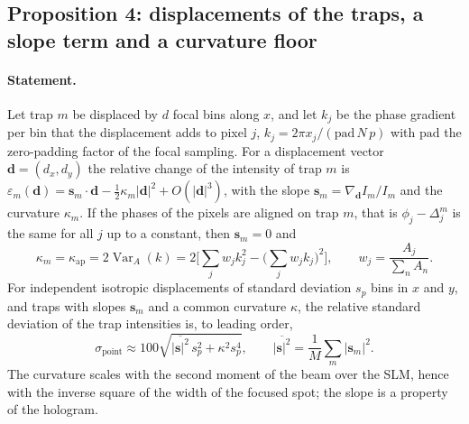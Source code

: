 \subsection{Proposition 4: displacements of the traps, a slope term and a curvature floor}

\paragraph{Statement.} Let trap $m$ be displaced by $d$ focal bins along $x$, and let $k_j$ be the phase gradient per bin that the displacement adds to pixel $j$, $k_j=2\pi x_j/(\mathrm{pad}\,N\,p)$ with $\mathrm{pad}$ the zero-padding factor of the focal sampling. For a displacement vector $\mathbf d=(d_x,d_y)$ the relative change of the intensity of trap $m$ is
$\varepsilon_m(\mathbf d)=\mathbf s_m\!\cdot\!\mathbf d-\tfrac12\kappa_m|\mathbf d|^2+O(|\mathbf d|^3)$, with the slope $\mathbf s_m=\nabla_{\mathbf d}I_m/I_m$ and the curvature $\kappa_m$. If the phases of the pixels are aligned on trap $m$, that is $\phi_j-\Delta_j^m$ is the same for all $j$ up to a constant, then $\mathbf s_m=0$ and
\begin{equation}
\kappa_m=\kappa_{\mathrm{ap}}=2\operatorname{Var}_A(k)=2\Big[\sum_jw_jk_j^2-\Big(\sum_jw_jk_j\Big)^2\Big],\qquad w_j=\frac{A_j}{\sum_nA_n}.\label{eq:curv}
\end{equation}
For independent isotropic displacements of standard deviation $s_p$ bins in $x$ and $y$, and traps with slopes $\mathbf s_m$ and a common curvature $\kappa$, the relative standard deviation of the trap intensities is, to leading order,
\begin{equation}
\sigma_{\mathrm{point}}\approx100\sqrt{\overline{|\mathbf s|^2}\,s_p^2+\kappa^2s_p^4},\qquad\overline{|\mathbf s|^2}=\frac1M\sum_m|\mathbf s_m|^2.\label{eq:pointing}
\end{equation}
The curvature scales with the second moment of the beam over the SLM, hence with the inverse square of the width of the focused spot; the slope is a property of the hologram.

